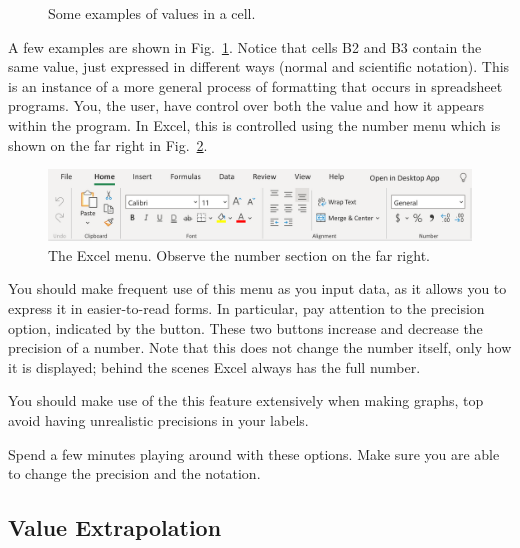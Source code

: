 \documentclass[10pt]{article}
\begin{document}
\begin{figure}[htpb]
	\centering
	\begin{sheetpic}
	\end{sheetpic}
	\caption{Some examples of values in a cell. }%
	\label{fig:valsincells}
\end{figure}

A few examples are shown in Fig.~\ref{fig:valsincells}.
Notice that cells B2 and B3 contain the same value, just expressed in different ways (normal and scientific notation).
This is an instance of a more general process of formatting that occurs in spreadsheet programs.
You, the user, have control over both the value and how it appears within the program.
In Excel, this is controlled using the number menu which is shown on the far right in Fig.~\ref{fig:images_Menu}.

\begin{figure}[htpb]
	\centering
	\includegraphics[width=0.8\linewidth]{images/Menu.png}
	\caption{The Excel menu. Observe the number section on the far right. }%
	\label{fig:images_Menu}
\end{figure}

You should make frequent use of this menu as you input data, as it allows you to express it in easier-to-read forms.
In particular, pay attention to the precision option, indicated by the  button. 
These two buttons increase and decrease the precision of a number. 
Note that this does not change the number itself, only how it is displayed; behind the scenes Excel always has the full number. 

You should make use of the this feature extensively when making graphs, top avoid having unrealistic precisions in your labels. 

Spend a few minutes playing around with these options. Make sure you are able to change the precision and the notation. 

\subsection{Value Extrapolation}%
\label{sub:value_extrapolation}
\end{document}
